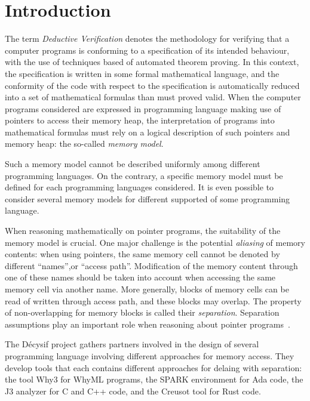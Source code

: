 \documentclass[a4paper,twoside]{article}
\begin{document}
\sloppy{}
\makeRR   %


\tableofcontents
\clearpage

\listoffigures

\clearpage

\section{Introduction}

The term \emph{Deductive Verification} denotes the methodology for verifying
that a computer programs is conforming to a specification of its intended
behaviour, with the use of techniques based of automated theorem proving. In
this context, the specification is written in some formal mathematical language,
and the conformity of the code with respect to the specification is
automatically reduced into a set of mathematical formulas than must proved
valid. When the computer programs considered are expressed in programming
language making use of pointers to access their memory heap, the interpretation
of programs into mathematical formulas must rely on a logical description of
such pointers and memory heap: the so-called \emph{memory model}.

Such a memory model cannot be described uniformly among different programming
languages. On the contrary, a specific memory model must be defined for each
programming languages considered. It is even possible to consider several memory
models for different supported of some programming language. 

When reasoning mathematically on pointer programs, the suitability of the memory
model is crucial. One major challenge is the potential \emph{aliasing} of memory
contents: when using pointers, the same memory cell cannot be denoted by
different ``names'',or ``access path''. Modification of the memory content
through one of these names should be taken into account when accessing the same
memory cell via another name. More generally, blocks of memory cells can be read
of written through access path, and these blocks may overlap. The property of
non-overlapping for memory blocks is called their \emph{separation}. Separation
assumptions play an important role when reasoning about pointer
programs~\cite{bornat00mpc}.

The Décysif project gathers partners involved in the design of several programming language involving different approaches for memory access. They develop tools that each contains different approaches for delaing with separation: the tool Why3 for WhyML programs, the SPARK environment for Ada code, the J3 analyzer for C and C++ code, and the Creusot tool for Rust code.
\end{document}
